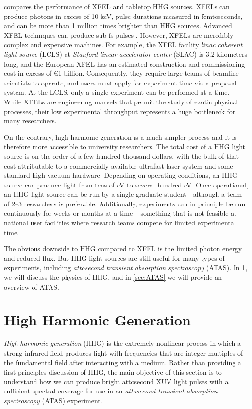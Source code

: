  compares the performance of XFEL and tabletop HHG sources. XFELs can produce photons in excess of 10 keV, pulse durations measured in femtoseconds, and can be more than 1 million times brighter than HHG sources. Advanced XFEL techniques can produce sub-fs pulses \cite{dingGenerationAttosecondXray2009}. However, XFELs are incredibly complex and expensive machines. For example, the XFEL facility \textit{linac coherent light source} (LCLS) at \textit{Stanford linear accelerator center} (SLAC) is 3.2 kilometers long, and the European XFEL has an estimated construction and commissioning cost in excess of \euro1 billion. Consequently, they require large teams of beamline scientists to operate, and users must apply for experiment time via a proposal system. At the LCLS, only a single experiment can be performed at a time. While XFELs are engineering marvels that permit the study of exotic physical processes, their low experimental throughput represents a huge bottleneck for many researchers.

On the contrary, high harmonic generation is a much simpler process and it is therefore more accessible to university researchers. The total cost of a HHG light source is on the order of a few hundred thousand dollars, with the bulk of that cost attributable to a commercially available ultrafast laser system and some standard high vacuum hardware. Depending on operating conditions, an HHG source can produce light from tens of eV to several hundred eV. Once operational, an HHG light source can be run by a single graduate student - although a team of 2--3 researchers is preferable. Additionally, experiments can in principle be run continuously for weeks or months at a time -- something that is not feasible at national user facilities where research teams compete for limited experimental time.

The obvious downside to HHG compared to XFEL is the limited photon energy and reduced flux. But HHG light sources are still useful for many types of experiments, including \textit{attosecond transient absorption spectroscopy} (ATAS). In \cref{sec:HHG}, we will discuss the physics of HHG, and in \cref{sec:ATAS} we will provide an overview of ATAS.

\section{High Harmonic Generation}
\label{sec:HHG}

\textit{High harmonic generation} (HHG) is the extremely nonlinear process in which a strong infrared field produces light with frequencies that are integer multiples of the fundamental field after interacting with a medium. Rather than providing a first principles discussion of HHG, the main objective of this section is to understand how we can produce bright attosecond XUV light pulses with a sufficient spectral coverage for use in an \textit{attosecond transient absorption spectroscopy} (ATAS) experiment.

